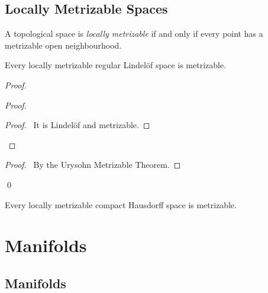 \section{Locally Metrizable Spaces}

\begin{definition}
    A topological space is \emph{locally metrizable} if and only if
    every point has a metrizable open neighbourhood.
\end{definition}

\begin{proposition}
    Every locally metrizable regular Lindel\"{o}f space is metrizable.
\end{proposition}

\begin{proof}
    \pf
    \begin{proof}
        \begin{proof}
            \pf\ It is Lindel\"{o}f and metrizable.
        \end{proof}
    \end{proof}
    \begin{proof}
        \pf\ By the Urysohn Metrizable Theorem.
    \end{proof}
    \qed
\end{proof}

\begin{corollary}
    Every locally metrizable compact Hausdorff space is metrizable.
\end{corollary}

\chapter{Manifolds}

\section{Manifolds}

